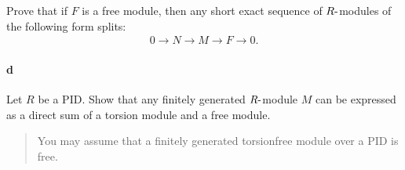 Prove that if \(F\) is a free module, then any short exact sequence of
\(R{\hbox{-}}\)modules of the following form splits:
\begin{align*}
0 \to N \to M \to F \to 0
.\end{align*}

\hypertarget{d-14}{%
\paragraph{d}\label{d-14}}

Let \(R\) be a PID. Show that any finitely generated
\(R{\hbox{-}}\)module \(M\) can be expressed as a direct sum of a
torsion module and a free module.

\begin{quote}
You may assume that a finitely generated torsionfree module over a PID
is free.
\end{quote}

